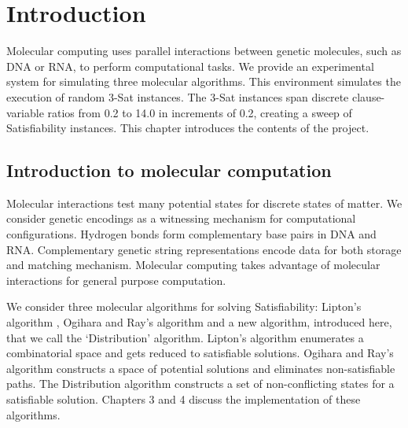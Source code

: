 \chapter{Introduction}


Molecular computing uses parallel interactions between genetic molecules, such as DNA or RNA, to perform computational tasks.  We provide an experimental system for simulating three molecular algorithms.  This environment simulates the execution of random $3$-{\sc Sat} instances.  The $3$-{\sc Sat} instances span discrete clause-variable ratios from 0.2 to 14.0 in increments of 0.2, creating a sweep of {\sc Satisfiability} instances.  This chapter introduces the contents of the project.

\section{Introduction to molecular computation}
	
				
Molecular interactions test many potential states for discrete states of matter.  We consider genetic encodings as a witnessing mechanism for computational configurations.  Hydrogen bonds form complementary base pairs in DNA and RNA.  Complementary genetic string representations encode data for both storage and matching mechanism.  Molecular computing takes advantage of molecular interactions for general purpose computation.

	We consider three molecular algorithms for solving {\sc Satisfiability}: Lipton's algorithm \cite{Lipton95usingdna}, Ogihara and Ray's algorithm \cite{Ogihara:1996:BFS:898228, Ogihara97dna-basedparallel} and a new algorithm, introduced here, that we call the `Distribution' algorithm.  Lipton's algorithm enumerates a combinatorial space and gets reduced to satisfiable solutions.  Ogihara and Ray's algorithm constructs a space of potential solutions and eliminates non-satisfiable paths.  The Distribution algorithm constructs a set of non-conflicting states for a satisfiable solution.  Chapters 3 and 4 discuss the implementation of these algorithms.
				
